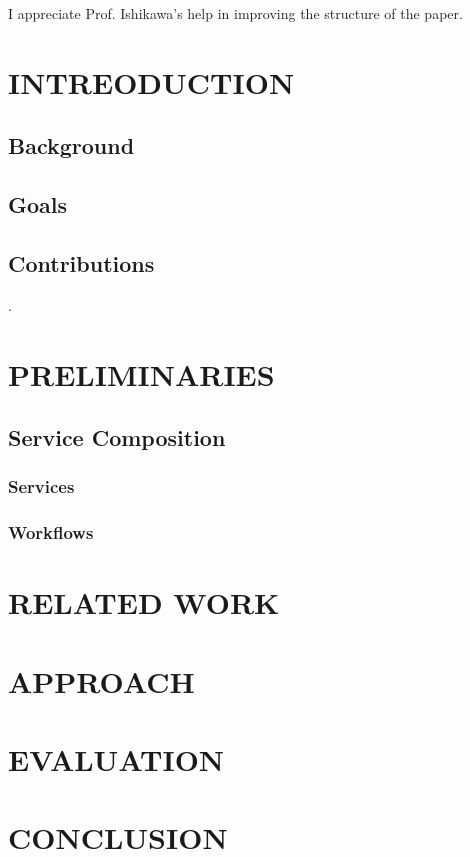 \documentclass[senior,final,11pt]{iscs-thesis}
\begin{document}
\begin{acknowledge}
I appreciate Prof. Ishikawa's help in improving the structure of the paper.
\end{acknowledge}

\frontmatter 
\tableofcontents
\mainmatter 

\chapter{INTREODUCTION}

\section{Background}
\section{Goals}
\section{Contributions}
\cite{4065825}. 
\chapter{PRELIMINARIES}

\section{Service Composition}
\subsection{Services}
\subsection{Workflows}
\chapter{RELATED WORK}

\chapter{APPROACH}

\chapter{EVALUATION}

\chapter{CONCLUSION}

 
 
\end{document}
